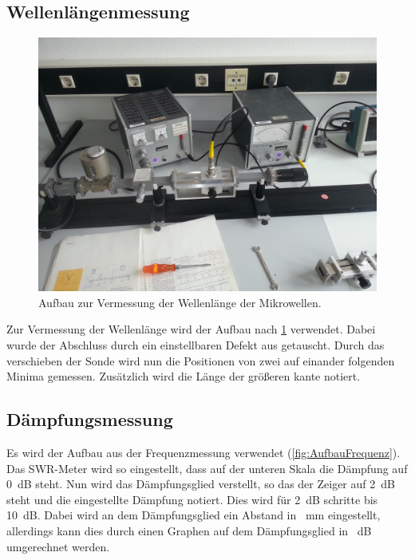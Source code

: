 \subsection{Wellenlängenmessung}\label{sec:Wellenlänge}
\begin{figure}[h!]
	\centering
	\includegraphics[scale = 0.1]{../Grafiken/Aufbau_3.jpg}
	\caption{Aufbau zur Vermessung der Wellenlänge der Mikrowellen.}\label{fig:AufbauWellenlänge}
\end{figure}
Zur Vermessung der Wellenlänge wird der Aufbau nach \cref{fig:AufbauWellenlänge} verwendet. Dabei wurde der Abschluss durch ein einstellbaren Defekt aus getauscht. Durch das verschieben der Sonde wird nun die Positionen von zwei auf einander folgenden Minima gemessen. Zusätzlich wird die Länge der größeren kante notiert.
\subsection{Dämpfungsmessung}
Es wird der Aufbau aus der Frequenzmessung verwendet (\cref{fig:AufbauFrequenz}). Das SWR-Meter wird so eingestellt, dass auf der unteren Skala die Dämpfung auf \SI{0}{\deci\bel} steht. Nun wird das Dämpfungsglied verstellt, so das der Zeiger auf \SI{2}{\deci\bel} steht und die eingestellte Dämpfung notiert. Dies wird für  \SI{2}{\deci\bel} schritte bis \SI{10}{\deci\bel}. Dabei wird an dem Dämpfungsglied ein Abstand in \SI{}{\milli\meter} eingestellt, allerdings kann dies durch einen Graphen auf dem Dämpfungsglied in \SI{}{\deci\bel} umgerechnet werden.
